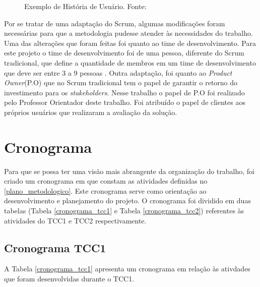 \begin{itemize}
\begin{figure}[H]
\caption{Exemplo de História de Usuário. Fonte: \cite{sabbagh_scrum:_2014}}
\label{img:us}
\end{figure}

\end{itemize}

Por se tratar de uma adaptação do Scrum, algumas modificações foram necessárias para que a metodologia pudesse atender às necessidades do trabalho. Uma das alterações que foram feitas foi quanto ao time de desenvolvimento. Para este projeto o time de desenvolvimento foi de uma pessoa, diferente do Scrum tradicional, que define a quantidade de membros em um time de desenvolvimento que deve ser entre 3 a 9 pessoas \cite{sabbagh_scrum:_2014}. Outra adaptação, foi quanto ao \textit{Product Owner}(P.O) que no Scrum tradicional tem o papel de garantir o retorno do investimento para os \textit{stakeholders}. Nesse trabalho o papel de P.O foi realizado pelo Professor Orientador deste trabalho. Foi atribuído o papel de clientes aos próprios usuários que realizaram a avaliação da solução.


\section{Cronograma}
\label{cronograma}

Para que se possa ter uma visão mais abrangente da organização do trabalho, foi criado um cronograma em que constam as atividades definidas no \ref{plano_metodologico}. Este cronograma serve como orientação ao desenvolvimento e planejamento do projeto. O cronograma foi dividido em duas tabelas (Tabela \ref{cronograma_tcc1} e Tabela \ref{cronograma_tcc2}) referentes às atividades do TCC1 e TCC2 respectivamente.

\subsection{Cronograma TCC1}
A Tabela \ref{cronograma_tcc1} apresenta um cronograma em relação às ativdades que foram desenvolvidas durante o TCC1.

